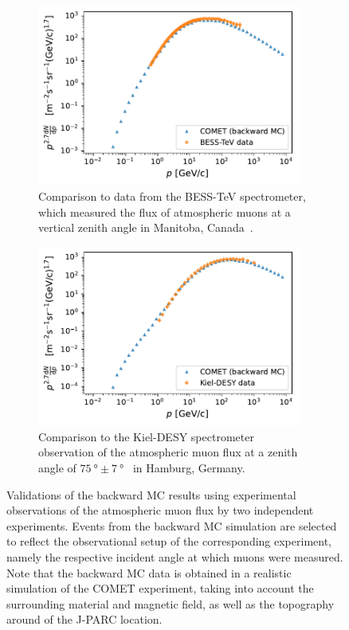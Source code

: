 \begin{figure}
    \centering
    \begin{subfigure}[t]{0.49\textwidth}
        \centering
        \includegraphics[width=0.95\textwidth]{chapter5/comparison_besstev.pdf}
        \caption{
            Comparison to data from the BESS-TeV spectrometer,
            which measured the flux of atmospheric muons at a vertical zenith
            angle in Manitoba, Canada~\cite{besstev}. }
    \end{subfigure}
    \hfill
    \begin{subfigure}[t]{0.49\textwidth}
        \centering
        \includegraphics[width=0.95\textwidth]{chapter5/comparison_kieldesy.pdf}
        \caption{ 
            Comparison to the Kiel-DESY spectrometer observation of the
            atmospheric muon flux at a zenith angle of $\SI{75}{\degree} \pm
            \SI{7}{\degree}$~\cite{kieldesy} in Hamburg, Germany.}
    \end{subfigure}
    \caption{
        Validations of the backward MC results using experimental observations of the
        atmospheric muon flux by two independent experiments. Events from the
        backward MC simulation are selected to reflect the observational setup of
        the corresponding experiment, namely the respective incident angle at
        which muons were measured. Note that the backward MC data is obtained in
        a realistic simulation of the COMET experiment, taking into account the
        surrounding material and magnetic field, as well as the topography
        around of the J-PARC location.
    }
    \label{fig:bmc_validations}
\end{figure}

